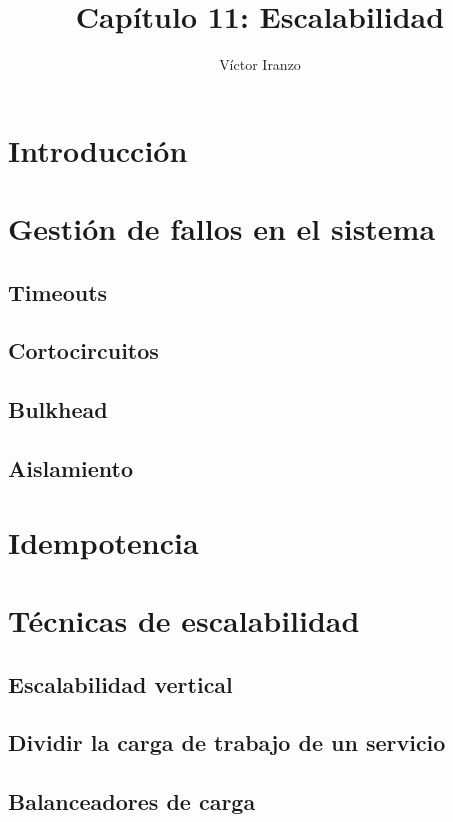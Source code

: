 \documentclass[11pt,a4paper]{article}
\author{Víctor Iranzo}
\title{Capítulo 11: Escalabilidad}
\begin{document}
\maketitle

\section{Introducción}

\section{Gestión de fallos en el sistema}

\subsection{Timeouts}

\subsection{Cortocircuitos}

\subsection{Bulkhead}

\subsection{Aislamiento}

\section{Idempotencia}

\section{Técnicas de escalabilidad}

\subsection{Escalabilidad vertical}

\subsection{Dividir la carga de trabajo de un servicio}

\subsection{Balanceadores de carga}
\end{document}
